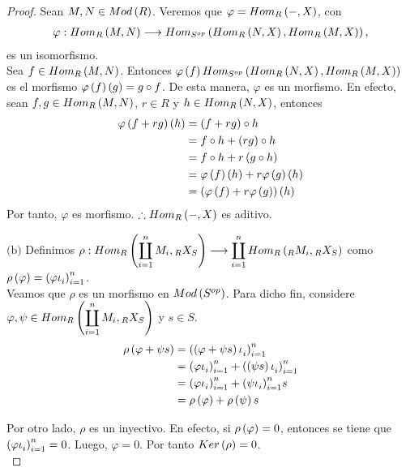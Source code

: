\documentclass{article}
\begin{document}
\begin{enumerate}[label=\textbf{Ej \arabic*.}]
\begin{proof}
		Sean $M,N \in Mod\left(R\right)$. Veremos que $\varphi=Hom_{R}\left(-,X\right)$, con
		\begin{align*}
			\varphi:Hom_{R}\left(M,N\right)\longrightarrow Hom_{{S}^{op}}\left(Hom_{R}\left(N,X\right),Hom_{R}\left(M,X\right)\right),
		\end{align*}
		es un isomorfismo.\\
		
		Sea $f\in Hom_{R}\left(M,N\right)$. Entonces $\varphi\left(f\right)Hom_{{S}^{op}}\left(Hom_{R}\left(N,X\right),Hom_{R}\left(M,X\right)\right)$ es el morfismo $\varphi\left(f\right)\left(g\right)=g \circ f$. De esta manera, $\varphi$ es un morfismo. En efecto, sean $f,g\in Hom_{R}\left(M,N\right)$, $r \in R$ y $h\in Hom_{R}\left(N,X\right)$, entonces
		\begin{align*}
			\varphi\left(f+rg\right)\left(h\right) &= \left(f+rg\right) \circ h\\
			&=f \circ h + \left(rg\right) \circ h\\
			&=f \circ h + r\left(g \circ h\right)\\
			&=\varphi\left(f\right)\left(h\right)+r\varphi\left(g\right)\left(h\right)\\
			&=\left(\varphi\left(f\right)+r\varphi\left(g\right)\right)\left(h\right)
		\end{align*}
		Por tanto, $\varphi$ es morfismo. $\therefore Hom_{R}\left(-,X\right)$ es aditivo.
	
		$\boxed{\text{(b)}}$ Definimos $\rho : \ringmodhom{R}{\displaystyle\coprod_{i=1}^{n}M_{i}}{\ringbimod{R}{S}{X}{lr}} \longrightarrow \displaystyle\coprod_{i=1}^{n}\ringmodhom{R}{\ringmod{R}{M_{i}}{l}}{\ringbimod{R}{S}{X}{lr}}$ como $\rho\left(\varphi\right)={\left({\varphi\iota}_{i}\right)}_{i=1}^{n}$.\\
		
		Veamos que $\rho$ es un morfismo en $Mod\left({S}^{op}\right)$. Para dicho fin, considere $\varphi , \psi \in \ringmodhom{R}{\displaystyle\coprod_{i=1}^{n}M_{i}}{\ringbimod{R}{S}{X}{lr}}$ y $s \in S$.
		\begin{align*}
			\rho\left(\varphi + \psi s\right) &= {\left({\left(\varphi + \psi s\right)\iota}_{i}\right)}_{i=1}^{n}\\
			&= {\left({\varphi\iota}_{i}\right)}_{i=1}^{n} + {\left({\left(\psi s\right)\iota}_{i}\right)}_{i=1}^{n}\\
			&= {\left({\varphi\iota}_{i}\right)}_{i=1}^{n} + {\left({\psi\iota}_{i}\right)}_{i=1}^{n} s\\
			&= \rho\left(\varphi\right) + \rho\left(\psi\right) s
		\end{align*}
		
		Por otro lado, $\rho$ es un inyectivo. En efecto, si $\rho\left(\varphi\right)=0$, entonces se tiene que ${\left({\varphi\iota}_{i}\right)}_{i=1}^{n}=0$. Luego, $\varphi=0$. Por tanto $Ker\left(\rho\right)=0$.\\
		

\end{proof}
\end{enumerate}
\end{document}
